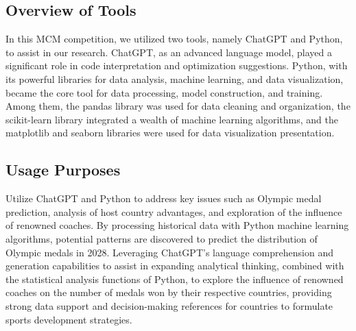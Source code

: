 \documentclass{mcmthesis}  %
\begin{document}
\subsection{Overview of Tools}
\hspace*{1.5em}In this MCM competition, we utilized two tools, namely ChatGPT and Python, to assist in our research. ChatGPT, as an advanced language model, played a significant role in code interpretation and optimization suggestions. Python, with its powerful libraries for data analysis, machine learning, and data visualization, became the core tool for data processing, model construction, and training. Among them, the pandas library was used for data cleaning and organization, the scikit-learn library integrated a wealth of machine learning algorithms, and the matplotlib and seaborn libraries were used for data visualization presentation.
\subsection{Usage Purposes}
\hspace*{1.5em}Utilize ChatGPT and Python to address key issues such as Olympic medal prediction, analysis of host country advantages, and exploration of the influence of renowned coaches. By processing historical data with Python machine learning algorithms, potential patterns are discovered to predict the distribution of Olympic medals in 2028. Leveraging ChatGPT's language comprehension and generation capabilities to assist in expanding analytical thinking, combined with the statistical analysis functions of Python, to explore the influence of renowned coaches on the number of medals won by their respective countries, providing strong data support and decision-making references for countries to formulate sports development strategies.
\end{document}
